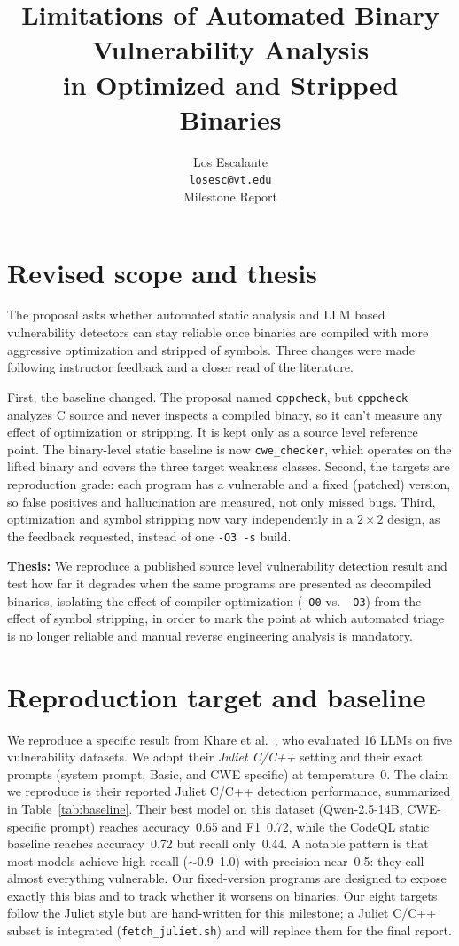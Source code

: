 \documentclass[10pt]{article}
\title{Limitations of Automated Binary Vulnerability Analysis\\in Optimized and Stripped Binaries}
\author{Los Escalante \\ \texttt{losesc@vt.edu} \\ Milestone Report}
\date{}
\begin{document}
\maketitle

\section{Revised scope and thesis}
The proposal asks whether automated static analysis and LLM based vulnerability
detectors can stay reliable once binaries are compiled with more aggressive optimization
and stripped of symbols. Three changes were made following instructor feedback and a
closer read of the literature.

First, the baseline changed. The proposal named \texttt{cppcheck}, but
\texttt{cppcheck} analyzes C source and never inspects a compiled binary, so it
can't measure any effect of optimization or stripping. It is kept only as a
source level reference point. The binary-level static baseline is now
\texttt{cwe\_checker}, which operates on the lifted binary and covers the three
target weakness classes. Second, the targets are reproduction grade:
each program has a vulnerable and a fixed (patched) version, so false positives
and hallucination are measured, not only missed bugs. Third, optimization and
symbol stripping now vary independently in a $2\times2$ design, as
the feedback requested, instead of one \texttt{-O3 -s} build.

\textbf{Thesis:} We reproduce a published source level
vulnerability detection result and test how far it degrades when the same
programs are presented as decompiled binaries, isolating the effect of compiler
optimization (\texttt{-O0} vs.\ \texttt{-O3}) from the effect of symbol stripping,
in order to mark the point at which automated triage is no
longer reliable and manual reverse engineering analysis is mandatory.

\section{Reproduction target and baseline}
We reproduce a specific result from Khare et al.~\cite{khare2024}, who evaluated
16 LLMs on five vulnerability datasets. We adopt their \emph{Juliet C/C++}
setting and their exact prompts (system prompt, Basic, and CWE specific) at
temperature~0. The claim we reproduce is their reported Juliet C/C++ detection
performance, summarized in Table~\ref{tab:baseline}. Their best model on this
dataset (Qwen-2.5-14B, CWE-specific prompt) reaches accuracy~0.65 and F1~0.72,
while the CodeQL static baseline reaches accuracy~0.72 but recall only~0.44.
A notable pattern is that most models achieve high recall ($\sim$0.9--1.0) with
precision near~0.5: they call almost everything vulnerable. Our fixed-version
programs are designed to expose exactly this bias and to track whether it worsens
on binaries. Our eight targets follow the Juliet style but are hand-written for this milestone; a Juliet C/C++ subset is integrated (\texttt{fetch\_juliet.sh}) and will replace them for the final report.
\end{document}
